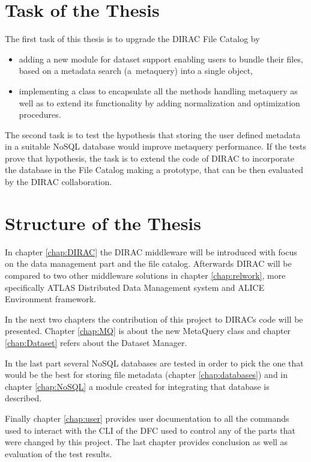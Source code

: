 \section*{Task of the Thesis}

The first task of this thesis is to upgrade the DIRAC File Catalog by 
\begin{itemize}
\item adding a new module for dataset support enabling users to bundle their files, based on a metadata search 
(a~metaquery) into a single object,
\item implementing a class to encapsulate all the methods handling metaquery as well as to extend its 
functionality by adding normalization and optimization procedures.
\end{itemize}

The second task is to test the hypothesis that storing the user defined metadata in a suitable NoSQL database 
would improve metaquery performance. If the tests prove that hypothesis, the task is to extend the code of DIRAC 
to incorporate the database in the File Catalog making a prototype, that can be then evaluated by the DIRAC 
collaboration.

\section*{Structure of the Thesis}

In chapter \ref{chap:DIRAC} the DIRAC middleware will be introduced with focus on the data management part and the 
file catalog. Afterwards DIRAC will be compared to two other middleware solutions in chapter \ref{chap:relwork}, 
more specifically ATLAS Distributed Data Management system and ALICE Environment framework.

In the next two chapters the contribution of this project to DIRACs code will be presented. Chapter \ref{chap:MQ} 
is about the new MetaQuery class and chapter \ref{chap:Dataset} refers about the Dataset Manager.

In the last part several NoSQL databases are tested in order to pick the one that would be the best for storing
file metadata (chapter \ref{chap:databases}) and in chapter \ref{chap:NoSQL} a module created for integrating that 
database is described. 

Finally chapter \ref{chap:user} provides user documentation to all the commands used to interact with the CLI of 
the DFC used to control any of the parts that were changed by this project. The last chapter
provides conclusion as well as evaluation of the test results.